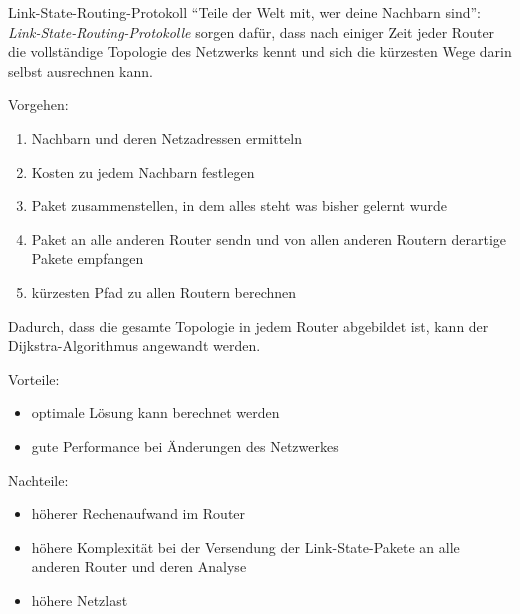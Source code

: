 \begin{defi}{Link-State-Routing-Protokoll}
    \enquote{Teile der Welt mit, wer deine Nachbarn sind}: \emph{Link-State-Routing-Protokolle} sorgen dafür, dass nach einiger Zeit jeder Router die vollständige Topologie des Netzwerks kennt und sich die kürzesten Wege darin selbst ausrechnen kann.

    Vorgehen:
    \begin{enumerate}
        \item Nachbarn und deren Netzadressen ermitteln
        \item Kosten zu jedem Nachbarn festlegen
        \item Paket zusammenstellen, in dem alles steht was bisher gelernt wurde
        \item Paket an alle anderen Router sendn und von allen anderen Routern derartige Pakete empfangen
        \item kürzesten Pfad zu allen Routern berechnen
    \end{enumerate}

    Dadurch, dass die gesamte Topologie in jedem Router abgebildet ist, kann der Dijkstra-Algorithmus angewandt werden.

    Vorteile:
    \begin{itemize}
        \item optimale Lösung kann berechnet werden
        \item gute Performance bei Änderungen des Netzwerkes
    \end{itemize}

    Nachteile:
    \begin{itemize}
        \item höherer Rechenaufwand im Router
        \item höhere Komplexität bei der Versendung der Link-State-Pakete an alle anderen Router und deren Analyse
        \item höhere Netzlast
    \end{itemize}
\end{defi}


